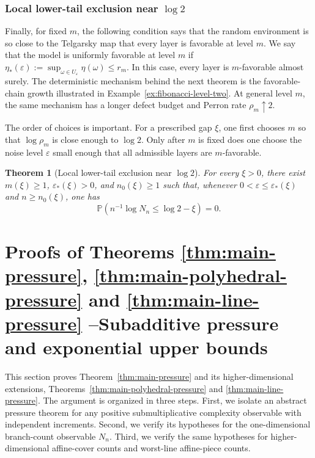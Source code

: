\documentclass[11pt]{amsart}
\numberwithin{equation}{section}
\theoremstyle{plain}
\newtheorem{theorem}{Theorem}[section]
\theoremstyle{definition}
\theoremstyle{remark}
\begin{document}
\subsubsection{Local lower-tail exclusion near \(\log 2\)}

Finally, for fixed \(m\), the following condition says that the random environment is so close to the Telgarsky map that every layer is favorable at level \(m\). We say that the model is uniformly favorable at level \(m\) if \(\eta_\ast(\varepsilon):=\sup_{\omega\in U_\varepsilon}\eta(\omega)\le r_m\). In this case, every layer is \(m\)-favorable almost surely.
The deterministic mechanism behind the next theorem is the favorable-chain growth illustrated in Example~\ref{ex:fibonacci-level-two}. At general level \(m\), the same mechanism has a longer defect budget and Perron rate \(\rho_m\uparrow2\).

The order of choices is important. For a prescribed gap \(\xi\), one first chooses \(m\) so that \(\log\rho_m\) is close enough to \(\log 2\). Only after \(m\) is fixed does one choose the noise level \(\varepsilon\) small enough that all admissible layers are \(m\)-favorable.

\begin{theorem}[Local lower-tail exclusion near \(\log 2\)]\label{thm:main-local}
For every \(\xi>0\), there exist \(m(\xi)\ge1\), \(\varepsilon_\ast(\xi)>0\), and \(n_0(\xi)\ge1\) such that, whenever \(0<\varepsilon\le\varepsilon_\ast(\xi)\) and \(n\ge n_0(\xi)\), one has \[\mathbb P(n^{-1}\log N_n\le\log 2-\xi)=0.\]
\end{theorem}


\section{Proofs of Theorems \ref{thm:main-pressure}, \ref{thm:main-polyhedral-pressure} and \ref{thm:main-line-pressure} --Subadditive pressure and exponential upper bounds}\label{sec:pressure}

This section proves Theorem~\ref{thm:main-pressure} and its higher-dimensional extensions, Theorems~\ref{thm:main-polyhedral-pressure} and \ref{thm:main-line-pressure}. The argument is organized in three steps. First, we isolate an abstract pressure theorem for any positive submultiplicative complexity observable with independent increments. Second, we verify its hypotheses for the one-dimensional branch-count observable \(N_n\). Third, we verify the same hypotheses for higher-dimensional affine-cover counts and worst-line affine-piece counts.
\end{document}
